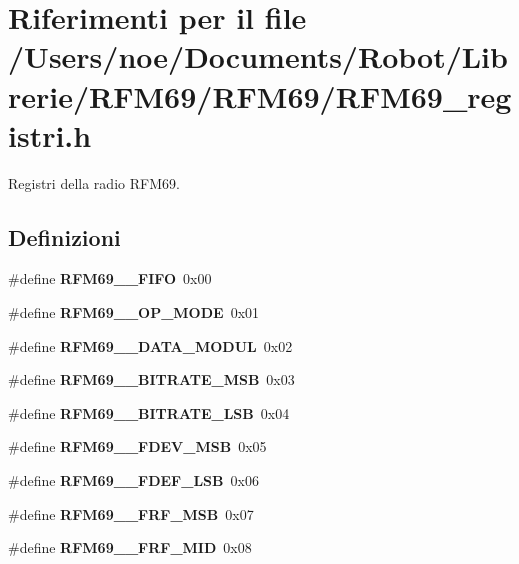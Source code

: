 \section{Riferimenti per il file /\+Users/noe/\+Documents/\+Robot/\+Librerie/\+R\+F\+M69/\+R\+F\+M69/\+R\+F\+M69\+\_\+registri.h}
\label{_r_f_m69__registri_8h}


Registri della radio R\+F\+M69.  


\subsection*{Definizioni}
\begin{DoxyCompactItemize}
\item 
\mbox{\label{_r_f_m69__registri_8h_a0d65a2190c0877f705ef6b3f6bb2d181}} 
\#define {\bfseries R\+F\+M69\+\_\+\_\+\+F\+I\+FO}~0x00
\item 
\mbox{\label{_r_f_m69__registri_8h_a7026c0eeb6c9ff4a3c836b9c2510e92d}} 
\#define {\bfseries R\+F\+M69\+\_\+\_\+\+O\+P\+\_\+\+M\+O\+DE}~0x01
\item 
\mbox{\label{_r_f_m69__registri_8h_ac3e0614cefd0de36fab33cf18fd6178a}} 
\#define {\bfseries R\+F\+M69\+\_\+\_\+\+D\+A\+T\+A\+\_\+\+M\+O\+D\+UL}~0x02
\item 
\mbox{\label{_r_f_m69__registri_8h_aee33de14b2c7923a72fa3fb94675d502}} 
\#define {\bfseries R\+F\+M69\+\_\+\_\+\+B\+I\+T\+R\+A\+T\+E\+\_\+\+M\+SB}~0x03
\item 
\mbox{\label{_r_f_m69__registri_8h_a9a6fb1af1b6dbb92986013cd5fc61667}} 
\#define {\bfseries R\+F\+M69\+\_\+\_\+\+B\+I\+T\+R\+A\+T\+E\+\_\+\+L\+SB}~0x04
\item 
\mbox{\label{_r_f_m69__registri_8h_ad77df18feac22de48ea0d31db04b5f51}} 
\#define {\bfseries R\+F\+M69\+\_\+\_\+\+F\+D\+E\+V\+\_\+\+M\+SB}~0x05
\item 
\mbox{\label{_r_f_m69__registri_8h_a3fb6b789781742b9d2e2c54f52cf39a3}} 
\#define {\bfseries R\+F\+M69\+\_\+\_\+\+F\+D\+E\+F\+\_\+\+L\+SB}~0x06
\item 
\mbox{\label{_r_f_m69__registri_8h_a49246229de4a1430a500dc4acd071760}} 
\#define {\bfseries R\+F\+M69\+\_\+\_\+\+F\+R\+F\+\_\+\+M\+SB}~0x07
\item 
\mbox{\label{_r_f_m69__registri_8h_ab1ac01a794ac98b0d681bfd4162e50ee}} 
\#define {\bfseries R\+F\+M69\+\_\+\_\+\+F\+R\+F\+\_\+\+M\+ID}~0x08

\end{DoxyCompactItemize}
